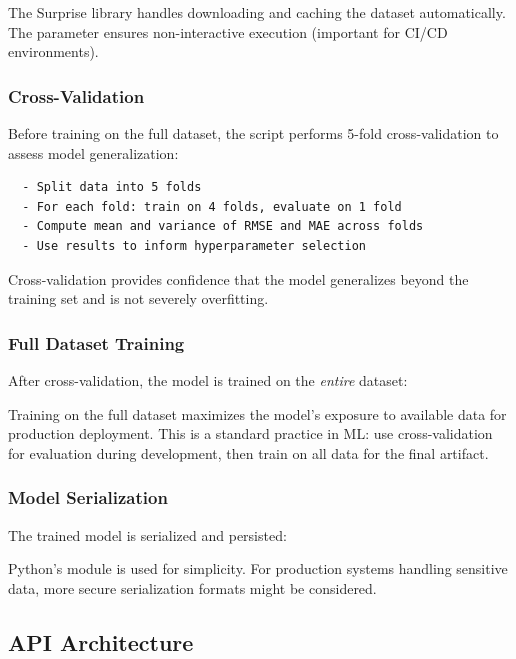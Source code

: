 The Surprise library handles downloading and caching the dataset automatically. The  
parameter ensures non-interactive execution (important for CI/CD environments).

\subsubsection{Cross-Validation}

Before training on the full dataset, the script performs 5-fold cross-validation to assess model generalization:

\begin{verbatim}
  - Split data into 5 folds
  - For each fold: train on 4 folds, evaluate on 1 fold
  - Compute mean and variance of RMSE and MAE across folds
  - Use results to inform hyperparameter selection
\end{verbatim}

Cross-validation provides confidence that the model generalizes beyond the training set and is not 
severely overfitting.

\subsubsection{Full Dataset Training}

After cross-validation, the model is trained on the \textit{entire} dataset:



Training on the full dataset maximizes the model's exposure to available data for production deployment. 
This is a standard practice in ML: use cross-validation for evaluation during development, then train on 
all data for the final artifact.

\subsubsection{Model Serialization}

The trained model is serialized and persisted:



Python's  module is used for simplicity. For production systems handling sensitive data, 
more secure serialization formats might be considered.

\subsection{API Architecture}

